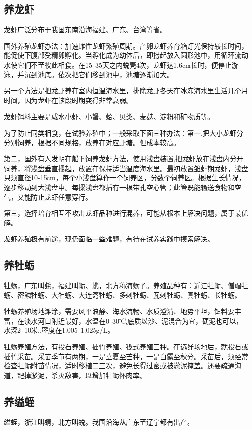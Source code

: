 \documentclass{ctexbook}
\begin{document}
\subsection{养龙虾}
龙虾广泛分布于我国东南沿海福建、广东、台湾等省。

国外养殖龙虾办法：加速雌性龙虾繁殖周期。产卵龙虾养育箱灯光保持较长时间，能促使下腹部受精卵孵化。当孵化成为幼体后，即捞起放入圆形池中，用循环流动水使它们不至彼此相食。在15--35天之内蜕壳4次，龙虾达1.6cm长时，便停止游泳，并沉到池底。依次把它们移到池中，池塘逐渐加大。

另一个方法是把龙虾养在室内恒温海水里，排除龙虾冬天在冰冻海水里生活几个月时间，因为龙虾在该段时期变得非常衰弱。

龙虾饵料主要是咸水小虾、小蟹、蛤、贝类、麦麸、淀粉和矿物质等。

为了防止同类相食，在试验养殖中；一般采取下面三种办法：第一,把大小龙虾分分别饲养，根据不同规格，放养在对应虾塘。但成本较高。

第二，国外有人发明在船下饲养龙虾方法，使用浅盘装置,把龙虾放在浅盘内分开饲养，将浅盘垂直摞起，放置在保持适当温度海水里。最初放置雏虾期龙虾，浅盘只须直径10-15cm，每个小浅盘算作一个饲养区，分数个饲养区。根据生长情况，逐步移动到大浅盘中。每摞浅盘都插有一根带孔空心管；此管既能输送食物和空气，又能防止龙虾任意穿行。

第三，选择培育相互不攻击龙虾品种进行混养，可能从根本上解决问题，属于最优解。

龙虾养殖极有前途，现仍面临一些难题，有待在试养实践中摸索解决。
\subsection{养牡蛎}
牡蛎，广东叫蚝，福建叫蛎、蚮，北方称海蛎子。养殖品种有：近江牡蛎、僧帽牡蛎、密鳞牡蛎、大牡蛎、大连湾牡蛎、多刺牡蛎、瓦刺牡蛎、真牡蛎、长牡蛎。

牡蛎养殖场地滩涂，需要风平浪静、海水流畅、水质澄清、地势平坦，饵料要丰富，在淡水河口附近最好，水温在0--30℃,底质以沙、泥混合为宜，硬泥也可以，水深2--10米,.密度在1.005--1.025g/L。

牡蛎养殖方法，有投石养殖、插竹养殖、筏式养殖三种。在选好场地后，就投石或插竹采苗。采苗季节有两期，一是立夏至芒种，一是白露至秋分。采苗后，须经常检查牡蛎附苗情况，适时移植二三次，避免长得过密或被淤泥掩盖。还要疏通沟道，耙掉淤泥，杀灭敌害，以增加牡蛎怀肉率。
\subsection{养缢蛭}
缢蛭，浙江叫蜻，北方叫蜕。我国沿海从广东至辽宁都有出产。
\end{document}
